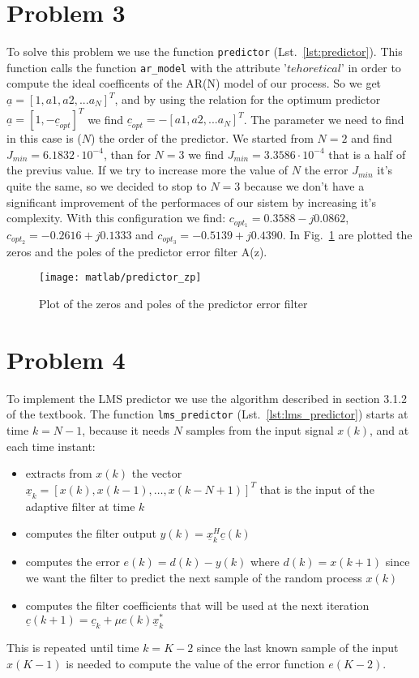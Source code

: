 \documentclass{article}
\newcommand{\inlinecode}[1]{\lstinline[basicstyle=\ttfamily,
    keywordstyle={}]{#1}}
\renewcommand{\vec}[1]{\underline{#1}}
\begin{document}
\section*{Problem 3}
To solve this problem we use the function \inlinecode{predictor} (Lst.~\ref{lst:predictor}). This function calls the function \inlinecode{ar_model} with the attribute '$tehoretical$' in order to compute the ideal coefficents of the AR(N) model of our process. So we get $ \vec{a} = [1, a1, a2,...a_N]^T $, and by using the relation for the optimum predictor $ \vec{a} = [1,-\vec{c}_{opt}]^T $ we find $ \vec{c}_{opt} = -[a1, a2,...a_N]^T$. The parameter we need to find in this case is ($N$) the order of the predictor. We started from $N=2$ and find $J_{min} = 6.1832\cdot10^{-4}$, than for $N=3$ we find $J_{min} = 3.3586\cdot10^{-4}$ that is a half of the previus value. If we try to increase more the value of $N$ the error $J_{min}$ it's quite the same, so we decided to stop to $N=3$ because we don't have a significant improvement of the performaces of our sistem by increasing it's complexity.
With this configuration we find: $c_{opt_1} = 0.3588 -j0.0862$,  $c_{opt_2} = -0.2616 +j0.1333$ and $c_{opt_3} = -0.5139 +j0.4390$.
\newline In Fig.~\ref{plot:predictor_zp} are plotted the zeros and the poles of the predictor error filter A(z). 
\begin{figure}[htbp]
  \centering
  \texttt{[image: matlab/predictor\_zp]}
  \caption{Plot of the zeros and poles of the predictor error filter}
  \label{plot:predictor_zp}
\end{figure}

\section*{Problem 4}
To implement the LMS predictor we use the algorithm described in
section 3.1.2 of the textbook. The function \inlinecode{lms_predictor}
(Lst.~\ref{lst:lms_predictor}) starts at time $k=N-1$, because it
needs $N$ samples from the input signal $x(k)$, and at each
time instant:
\begin{itemize}
  \item extracts from $x(k)$ the vector $\vec{x}_k = [x(k),
    x(k-1),\dots,x(k-N+1)]^T$ that is the input of the adaptive filter
    at time $k$
  \item computes the filter output $y(k) = \vec{x}_k^H\vec{c}(k)$
  \item computes the error $e(k) = d(k) - y(k)$ where $d(k) = x(k+1)$
    since we want the filter to predict the next sample of the random
    process $x(k)$
  \item computes the filter coefficients that will be used at the next
    iteration $\vec{c}(k+1) = \vec{c}_k + \mu e(k) \vec{x}_k^*$
\end{itemize}
This is repeated until time $k = K - 2$ since the last known sample of
the input $x(K-1)$ is needed to compute the value of the error
function $e(K-2)$.
\end{document}
